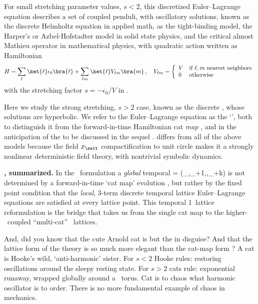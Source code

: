 For small stretching parameter values, $s<2$, this discretized
Euler–\-Lagrange equation  describes a set of coupled
penduli, with oscillatory solutions, known as the discrete Helmholtz
equation in applied math, as  the
tight-binding model, the Harper's or Azbel-Hofstadter model in solid
state physics,  and
the critical almost Mathieu operator in mathematical physics,
with quadratic action  written as Hamiltonian
\[ %
H=\sum_\ell\ket{\ell}\epsilon_0\bra{\ell}
  + \sum_{\ell m}\ket{\ell}V_{\ell m}\bra{m}
\,,\quad
   V_{\ell m} = \left\{
     \begin{array}{ll}
         V & \mbox{if\ } \ell,m \mbox{ nearest neighbors}\\
         0 & \mbox{otherwise}
     \end{array}
             \right.
\] %
with the stretching factor ${s}=-\epsilon_0/V$ in
.

Here we study the strong stretching, $s>2$ case, known as the discrete
\sPe{},
whose solutions are hyperbolic. We refer to the
Euler–\-Lagrange equation
 as the `{\em \templatt}', both to distinguish it from
the for\-ward-in-time Hamiltonian cat \emph{map} , and in the
anticipation of the \emph{\catlatt} to be discussed in the sequel
. {\catLatt} differs from all of the above models because the
field $\ssp_\zeit$ compactification to unit circle makes it a
strongly nonlinear deterministic field theory, with nontrivial symbolic
dynamics.

\bigskip

\noindent\textbf{\tempLatt, summarized.}
In the \spt\ formulation a \emph{global} {temporal {\lattstate}}
\beq
\transp{\Xx} %
             = (\ssp_\zeit,\ssp_{\zeit+1},\cdots,\ssp_{\zeit+k})
is not determined by a for\-ward-in-time `cat map' evolution
, but rather by the fixed point condition
that the \emph{local}, 3-term discrete temporal lattice Euler–Lagrange
equations  are satisfied at every lattice point. This
temporal 1\dmn\ lattice reformulation is the bridge that takes us from
the single cat map  to the higher-\dmn\ coupled
``multi-cat'' \spt\ lattices.

And, did you know that the cute Arnold cat is but the %
{\sPe} in disguise? And that the lattice form 
of the theory is so much more elegant than the
cat-map form ?
A cat is Hooke's wild, `anti-harmonic' sister.
For $s<2$ Hooke rules: restoring oscillations around the sleepy resting
state.
For $s>2$ cats rule: exponential runaway, wrapped globally around a
\statesp\ torus. {Cat} is to {chaos} what {harmonic oscillator} is to
{order}. There is no more fundamental example of chaos in mechanics.


\renewcommand{\period}[1]{{\ensuremath{T_{#1}}}}         %
